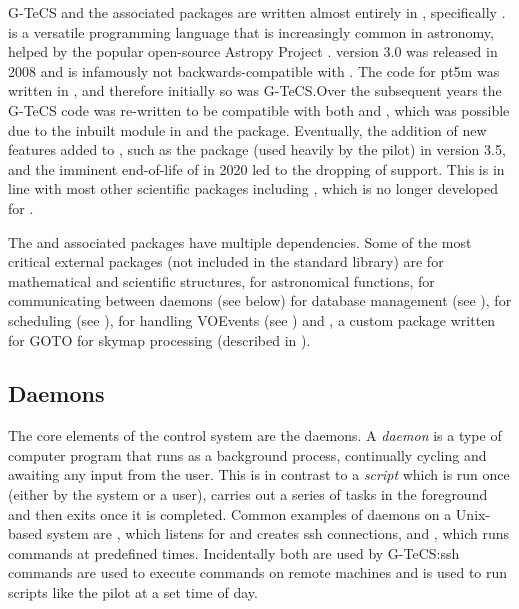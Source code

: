 \begin{colsection}
\begin{colsection}
G-TeCS and the associated packages are written almost entirely in , specifically .  is a versatile programming language that is increasingly common in astronomy, helped by the popular open-source Astropy Project \citep{astropy}.  version 3.0 was released in 2008 and is infamously not backwards-compatible with . The code for \gls{pt5m} was written in , and therefore initially so was G-TeCS.\@ Over the subsequent years the G-TeCS code was re-written to be compatible with both  and , which was possible due to the inbuilt  module in  and the  package. Eventually, the addition of new features added to , such as the  package (used heavily by the pilot) in version 3.5, and the imminent end-of-life of  in 2020 led to the dropping of  support. This is in line with most other scientific  packages including , which is no longer developed for . %

The  and associated packages have multiple dependencies. Some of the most critical external packages (not included in the  standard library) are  for mathematical and scientific structures,  for astronomical functions,  for communicating between daemons (see  below)  for  database management (see ),  for scheduling (see ),  for handling VOEvents (see ) and , a custom package written for GOTO for skymap processing (described in ).

\end{colsection}


\subsection{Daemons}
\label{sec:daemons}
\begin{colsection}

The core elements of the control system are the daemons. A \emph{daemon} is a type of computer program that runs as a background process, continually cycling and awaiting any input from the user. This is in contrast to a \emph{script} which is run once (either by the system or a user), carries out a series of tasks in the foreground and then exits once it is completed. Common examples of daemons on a Unix-based system are , which listens for and creates \gls{ssh} connections, and , which runs commands at predefined times. Incidentally both are used by G-TeCS:\@ \gls{ssh} commands are used to execute commands on remote machines and  is used to run scripts like the pilot at a set time of day.


\end{colsection}
\end{colsection}

